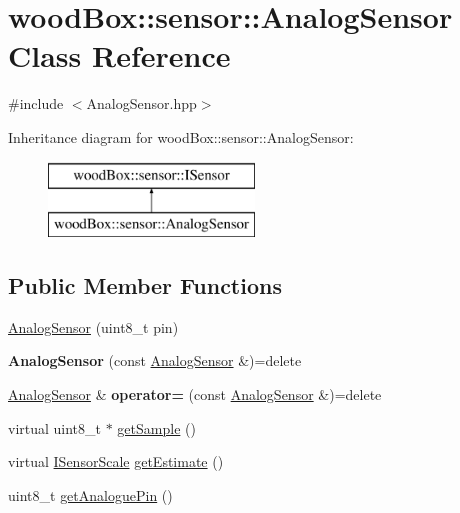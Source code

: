 \hypertarget{classwood_box_1_1sensor_1_1_analog_sensor}{}\section{wood\+Box\+:\+:sensor\+:\+:Analog\+Sensor Class Reference}
\label{classwood_box_1_1sensor_1_1_analog_sensor}


{\ttfamily \#include $<$Analog\+Sensor.\+hpp$>$}

Inheritance diagram for wood\+Box\+:\+:sensor\+:\+:Analog\+Sensor\+:\begin{figure}[H]
\begin{center}
\leavevmode
\includegraphics[height=2.000000cm]{classwood_box_1_1sensor_1_1_analog_sensor}
\end{center}
\end{figure}
\subsection*{Public Member Functions}
\begin{DoxyCompactItemize}
\item 
\mbox{\hyperlink{classwood_box_1_1sensor_1_1_analog_sensor_a41d8ff91cf91d2bdbccffe8f1316421b}{Analog\+Sensor}} (uint8\+\_\+t pin)
\item 
\mbox{\label{classwood_box_1_1sensor_1_1_analog_sensor_a8ee0238d3fab4515b5286e67f1f92083}} 
{\bfseries Analog\+Sensor} (const \mbox{\hyperlink{classwood_box_1_1sensor_1_1_analog_sensor}{Analog\+Sensor}} \&)=delete
\item 
\mbox{\label{classwood_box_1_1sensor_1_1_analog_sensor_a66111957aca931c1b1ea219749b03b3c}} 
\mbox{\hyperlink{classwood_box_1_1sensor_1_1_analog_sensor}{Analog\+Sensor}} \& {\bfseries operator=} (const \mbox{\hyperlink{classwood_box_1_1sensor_1_1_analog_sensor}{Analog\+Sensor}} \&)=delete
\item 
virtual uint8\+\_\+t $\ast$ \mbox{\hyperlink{classwood_box_1_1sensor_1_1_analog_sensor_ae78c25d8c01ba9acd03f90f278966189}{get\+Sample}} ()
\item 
virtual \mbox{\hyperlink{classwood_box_1_1sensor_1_1_i_sensor_aa377bda61ed0d4a1d7e1a7bffe459452}{I\+Sensor\+Scale}} \mbox{\hyperlink{classwood_box_1_1sensor_1_1_analog_sensor_a74ddcfe84f3f5b9d7010442f365c4eee}{get\+Estimate}} ()
\item 
uint8\+\_\+t \mbox{\hyperlink{classwood_box_1_1sensor_1_1_analog_sensor_a5a7c67726db40be3edd48294910b117b}{get\+Analogue\+Pin}} ()
\end{DoxyCompactItemize}

